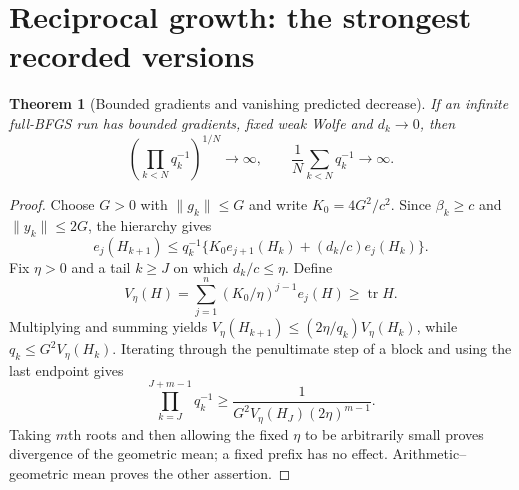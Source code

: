 \documentclass[10pt,oneside,openany]{book}
\newtheorem{theorem}{Theorem}[chapter]
\theoremstyle{remark}\newtheorem{remark}{Remark}[chapter]
\begin{document}
\section{Reciprocal growth: the strongest recorded versions}
\label{M:reciprocal}
\begin{theorem}[Bounded gradients and vanishing predicted decrease]\label{M:average}
If an infinite full-BFGS run has bounded gradients, fixed weak Wolfe and $d_k\to0$, then
\[
 \left(\prod_{k<N}q_k^{-1}\right)^{1/N}\to\infty,
 \qquad\frac1N\sum_{k<N}q_k^{-1}\to\infty.
\]
\end{theorem}
\begin{proof}
Choose $G>0$ with $\|g_k\|\le G$ and write $K_0=4G^2/c^2$. Since $\beta_k\ge c$ and $\|y_k\|\le2G$, the hierarchy gives
\[
 e_j(H_{k+1})\le q_k^{-1}\{K_0 e_{j+1}(H_k)+(d_k/c)e_j(H_k)\}.
\]
Fix $\eta>0$ and a tail $k\ge J$ on which $d_k/c\le\eta$. Define
\[
 V_\eta(H)=\sum_{j=1}^n(K_0/\eta)^{j-1}e_j(H)\ge\operatorname{tr}H.
\]
Multiplying and summing yields $V_\eta(H_{k+1})\le(2\eta/q_k)V_\eta(H_k)$, while $q_k\le G^2V_\eta(H_k)$. Iterating through the penultimate step of a block and using the last endpoint gives
\[
 \prod_{k=J}^{J+m-1}q_k^{-1}\ge\frac1{G^2V_\eta(H_J)(2\eta)^{m-1}}.
\]
Taking $m$th roots and then allowing the fixed $\eta$ to be arbitrarily small proves divergence of the geometric mean; a fixed prefix has no effect. Arithmetic--geometric mean proves the other assertion.
\end{proof}
\end{document}
